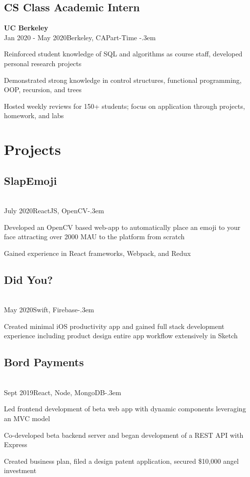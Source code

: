\documentclass{article}
\let\olditemize=\itemize \let\endolditemize=\enditemize
\renewenvironment{itemize}{\olditemize[topsep=0em] \itemsep-.3em}{\endolditemize}
\newcommand{\entry}[4]{\quad\textbf{#1}\\#2\qquad#3\qquad#4}
\begin{document}
	\subsection{CS Class Academic Intern}
	\entry{UC Berkeley}{Jan 2020 - May 2020}{Berkeley, CA}{Part-Time}
	\begin{itemize}
		\item Reinforced student knowledge of SQL and algorithms as course staff, developed personal research projects
		\item Demonstrated strong knowledge in control structures, functional programming, OOP, recursion, and trees
		\item Hosted weekly reviews for 150+ students; focus on application through projects, homework, and labs
	\end{itemize}
	
	\section{Projects}
	\subsection{SlapEmoji}
	\entry{}{July 2020}{ReactJS, OpenCV}
	\begin{itemize}
		\item Developed an OpenCV based web-app to automatically place an emoji to your face attracting over 2000 MAU to the platform from scratch
		\item Gained experience in React frameworks, Webpack, and Redux
	\end{itemize}

	\subsection{Did You?}
	\entry{}{May 2020}{Swift, Firebase}
	\begin{itemize}
		\item Created minimal iOS productivity app and gained full stack development experience including product design entire app workflow extensively in Sketch
	\end{itemize}

	\subsection{Bord Payments}
	\entry{}{Sept 2019}{React, Node, MongoDB}
	\begin{itemize}
		\item Led frontend development of beta web app with dynamic components leveraging an MVC model
		\item Co-developed beta backend server and began development of a REST API with Express
		\item Created business plan, filed a design patent application, secured \$10,000 angel investment
	\end{itemize}
	
\end{document}
